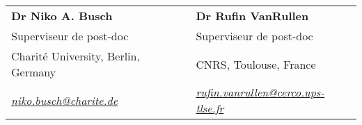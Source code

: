 \documentclass[margin,line]{resume}
\begin{document}
\begin{resume}
	\begin{tabular}{@{}p{6cm}p{6cm}}
	\textbf{Dr Niko A. Busch}       &  \textbf{Dr Rufin VanRullen}                   \\
	Superviseur de post-doc                   &  Superviseur de post-doc                       \\
	Charité University, Berlin, Germany         &  CNRS, Toulouse, France        \\
	\textsl{\href{mailto:niko.busch@charite.de}{niko.busch@charite.de}}  &  
	\textsl{\href{mailto:rufin.vanrullen@cerco.ups-tlse.fr}{rufin.vanrullen@cerco.ups-tlse.fr}}    \\
	\end{tabular}


	
\end{resume}
\end{document}
